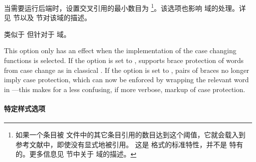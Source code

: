 \begin{optionlist}
当需要运行后端时，设置交叉引用的最小数目为 
\footnote{如果一个条目被  文件中的其它条目引用的数目达到这个阈值，它就会载入到参考文献中，即使没有显式地被引用。	这是 \bibtex  格式的标准特性，并不是 \biblatex 特有的。更多信息见  节中关于  域的描述。}。该选项也影响  域的处理。详见  节以及  节对该域的描述。


类似于  但针对于  域。

This option only has an effect when the  implementation of the case changing functions is selected. If the option is set to ,  supports brace protection of words from case change as in classical \bibtex. If the option is set to , pairs of braces no longer imply case protection, which can now be enforced by wrapping the relevant word in ---this makes for a less confusing, if more verbose, markup of case protection.
\end{optionlist}

\paragraph{特定样式选项}%
\label{use:opt:pre:bbx}


